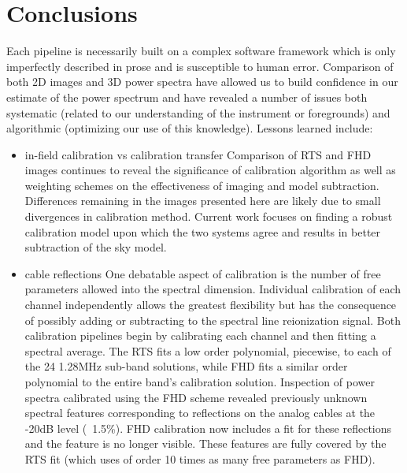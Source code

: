 \documentclass[preprint]{aastex}
\begin{document}
\section{Conclusions}
      Each pipeline is necessarily built on a complex software framework which is only imperfectly described in prose and is susceptible to human error.  Comparison of both 2D images and 3D power spectra have allowed us to build confidence in our estimate of the power spectrum and have revealed a number of issues both systematic (related to our understanding of the instrument or foregrounds) and algorithmic (optimizing our use of this knowledge). Lessons learned include:
\begin{itemize}
\item in-field calibration vs calibration transfer
Comparison of RTS and FHD images continues to reveal the significance of calibration algorithm as well as weighting schemes on the effectiveness of imaging and model subtraction.  Differences remaining in the images presented here are likely due to small divergences in calibration method. Current work focuses on finding a robust calibration model upon which the two systems agree and results in better subtraction of the sky model.

\item cable reflections
One debatable aspect of calibration is the number of free parameters allowed into the spectral dimension. Individual calibration of each channel independently allows the greatest flexibility but has the consequence of possibly adding or subtracting to the spectral line reionization signal.  Both calibration pipelines begin by calibrating each channel and then fitting a spectral average.  The RTS fits a low order polynomial, piecewise, to each of the 24 1.28MHz sub-band solutions, while FHD fits a similar order polynomial to the entire  band's calibration solution.  Inspection of power spectra calibrated using the FHD scheme revealed  previously unknown spectral features corresponding to reflections on the analog cables at the -20dB level (~1.5\%). FHD calibration now includes a fit for these reflections and the feature is no longer visible. These features are fully covered by the RTS fit (which uses of order 10 times as many free parameters as FHD).


\end{itemize}
\end{document}
